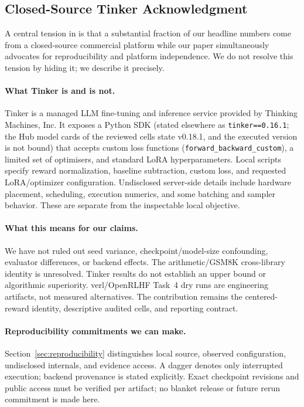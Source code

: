 \subsection{Closed-Source Tinker Acknowledgment}
\label{sec:tinker_closed}

A central tension in \ours{} is that a substantial fraction of our
headline numbers come from a closed-source commercial platform while our
paper simultaneously advocates for reproducibility and platform
independence. We do not resolve this tension by hiding it; we describe
it precisely.

\paragraph{What Tinker is and is not.}
Tinker \cite{thinkingmachines2024tinker} is a managed LLM fine-tuning and
inference service provided by Thinking Machines, Inc. It exposes a Python
SDK (stated elsewhere as \texttt{tinker==0.16.1}; the Hub model cards of the
reviewed cells state v0.18.1, and the executed version is not bound) that accepts custom loss functions
(\texttt{forward\_backward\_custom}), a limited set of optimisers, and
standard LoRA hyperparameters. Local scripts specify reward normalization, baseline subtraction, custom loss,
and requested LoRA/optimizer configuration. Undisclosed server-side details
include hardware placement, scheduling, execution numerics, and some batching
and sampler behavior. These are separate from the inspectable local objective.

\paragraph{What this means for our claims.}
We have not ruled out seed variance, checkpoint/model-size confounding, evaluator
differences, or backend effects. The arithmetic/GSM8K cross-library identity is
unresolved. Tinker results do not establish an upper bound or algorithmic
superiority. verl/OpenRLHF Task~4 dry runs are engineering artifacts, not
measured alternatives. The contribution remains the centered-reward identity,
descriptive audited cells, and reporting contract.

\paragraph{Reproducibility commitments we can make.}
Section~\ref{sec:reproducibility} distinguishes local source, observed
configuration, undisclosed internals, and evidence access. A dagger denotes only
interrupted execution; backend provenance is stated explicitly. Exact checkpoint
revisions and public access must be verified per artifact; no blanket release
or future rerun commitment is made here.

